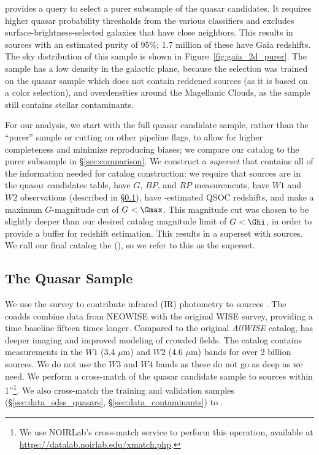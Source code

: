 \cite{gaia_collab_gaia_2022} provides a query to select a purer subsample of the quasar candidates.
It requires higher quasar probability thresholds from the various classifiers and excludes surface-brightness-selected galaxies that have close neighbors.
This results in  sources with an estimated purity of 95\%; 1.7 million of these have Gaia redshifts. 
The sky distribution of this sample is shown in Figure~\ref{fig:gaia_2d_purer}.
The sample has a low density in the galactic plane, because the selection was trained on the \SDSS quasar sample which does not contain reddened sources (as it is based on a color selection), and overdensities around the Magellanic Clouds, as the sample still contains stellar contaminants.

For our analysis, we start with the full quasar candidate sample, rather than the ``purer'' sample or cutting on other \Gaia pipeline flags, to allow for higher completeness and minimize reproducing biases; we compare our catalog to the \cite{gaia_collab_gaia_2022} purer subsample in \S\ref{sec:comparison}.
We construct a \emph{superset} that contains all of the information needed for catalog construction: we require that sources are in the \Gaia quasar candidates table, have \Gaia $G$, $BP$, and $RP$ measurements, have \unWISE $W1$ and $W2$ observations (described in \S\ref{sec:data_wise}), have \Gaia-estimated QSOC redshifts, and make a maximum $G$-magnitude cut of $G < \Gmax$.
This magnitude cut was chosen to be slightly deeper than our desired catalog magnitude limit of $G<\Ghi$, in order to provide a buffer for redshift estimation.
This results in a superset with  sources.
We call our final catalog the \catalog (\cat), so we refer to this as the \cat superset.


\subsection{The \unWISE Quasar Sample}
\label{sec:data_wise}

We use the \unWISE survey to contribute infrared (IR) photometry to \Gaia sources \citep{lang_unwise_2014,meisner_unwise_2019}.
The \unWISE coadds combine data from NEOWISE \citep{mainzer_preliminary_2011} with the original WISE \citep{wright_wide-field_2010} survey, providing a time baseline fifteen times longer.
Compared to the original \textsl{AllWISE} catalog, \unWISE has deeper imaging and improved modeling of crowded fields.
The \unWISE catalog \citep{schlafly_unwise_2019} contains measurements in the $W1$ (3.4 $\mu$m) and  $W2$ (4.6 $\mu$m) bands for over 2 billion sources.
We do not use the $W3$ and $W4$ bands as these do not go as deep as we need.
We perform a cross-match of the \Gaia quasar candidate sample to \unWISE sources within 1''\footnote{We use NOIRLab's cross-match service to perform this operation, available at \url{https://datalab.noirlab.edu/xmatch.php}.}.
We also cross-match the \SDSS training and validation samples (\S\ref{sec:data_sdss_quasars}, \S\ref{sec:data_contaminants}) to \unWISE.

